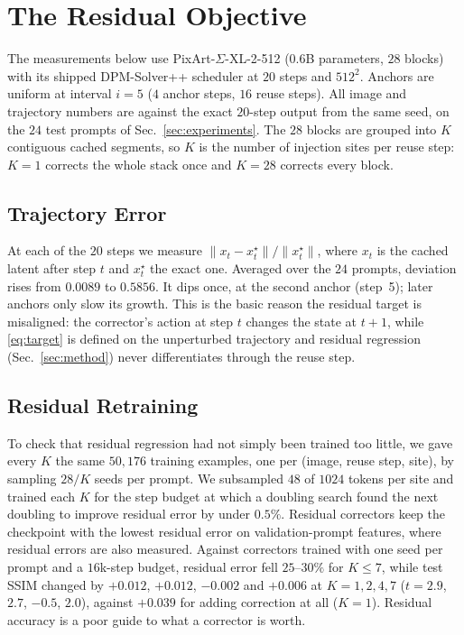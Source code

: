 \documentclass[conference,compsoc]{IEEEtran}
\begin{document}
\section{The Residual Objective}
\label{sec:diagnosis}

The measurements below use PixArt-$\Sigma$-XL-2-512
\cite{chen2024pixartsigma} ($0.6$B parameters, $28$ blocks) with its shipped
DPM-Solver++ scheduler \cite{lu2022dpmsolverpp} at $20$ steps and $512^2$.
Anchors are uniform at interval $i{=}5$ ($4$ anchor steps, $16$ reuse steps).
All image and trajectory numbers are against the exact $20$-step output from the same seed, on the
$24$ test prompts of Sec.~\ref{sec:experiments}. The $28$ blocks
are grouped into $K$ contiguous cached segments, so $K$ is the number of
injection sites per reuse step: $K{=}1$ corrects the whole stack once and
$K{=}28$ corrects every block.

\subsection{Trajectory Error}
At each of the $20$ steps we measure $\|x_t-x^\star_t\|/\|x^\star_t\|$, where
$x_t$ is the cached latent after step $t$ and $x^\star_t$ the exact one.
Averaged over the $24$ prompts, deviation rises from $0.0089$ to $0.5856$. It dips once, at the second anchor (step~5); later anchors only slow its growth.
This is the basic reason the residual target is misaligned: the corrector's
action at step $t$ changes the state at $t{+}1$, while \eqref{eq:target} is
defined on the unperturbed trajectory and residual regression
(Sec.~\ref{sec:method}) never differentiates through the reuse step.

\subsection{Residual Retraining}
\label{sec:retrain}
To check that residual regression had not simply been trained too little, we
gave every $K$ the same $50{,}176$ training examples, one per (image, reuse
step, site), by sampling $28/K$ seeds per prompt. We subsampled $48$ of $1024$ tokens per site and trained each $K$ for the step budget at which a doubling search found the next doubling to improve residual error by under $0.5\%$. Residual correctors keep the checkpoint with the lowest residual error on validation-prompt features, where residual errors are also measured. Against correctors trained with one seed per prompt and a $16$k-step budget, residual error fell $25$--$30\%$ for $K{\le}7$, while test SSIM changed by $+0.012$,
$+0.012$, $-0.002$ and $+0.006$ at $K{=}1,2,4,7$ ($t{=}2.9$, $2.7$, $-0.5$,
$2.0$), against $+0.039$ for adding correction at all ($K{=}1$). Residual
accuracy is a poor guide to what a corrector is worth.
\end{document}

